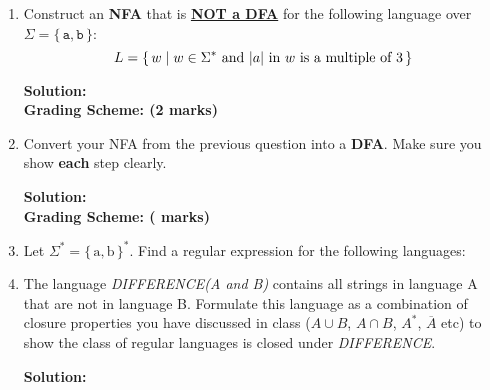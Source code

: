 \documentclass[11pt, article, oneside]{memoir}
\newcommand{\set}[1]{\{\, #1\, \}}
\DeclarePairedDelimiter\abs{\lvert}{\rvert}
\begin{document}
\begin{enumerate}
    \item
        Construct an \textbf{NFA} that is \textbf{\underline{NOT a DFA}} for the following language over \(\Sigma = \set{\texttt{a}, \texttt{b}}\):
        \[
            L = \set{w \mid w \in \Sigma^* \text{ and }
            \text{\(\abs{a}\) in \(w\) is a multiple of \(3\)}}
        \]
       
        \textbf{Solution:}
        \\

        \textbf{Grading Scheme: (2 marks)}
        \\
        
    \item
        Convert your NFA from the previous question into a \textbf{DFA}. Make sure you show \textbf{each} step clearly.
        
        \textbf{Solution:}
        \\

        \textbf{Grading Scheme: ( marks)}
        \\
        
    \item
        Let \(\Sigma^* = \set{\text{a}, \text{b}}^*\). Find a regular expression for the following languages:
    \item
        The language \textit{DIFFERENCE(A and B)} contains all strings in language A that are not in language B. Formulate this language as a combination of closure properties you have discussed in class ($A \cup B$, $A \cap B$, $A^*$, $\overline{A}$ etc) to show the class of regular languages is closed under \textit{DIFFERENCE}.
                
        \textbf{Solution:}
        
\end{enumerate}
\end{document}
